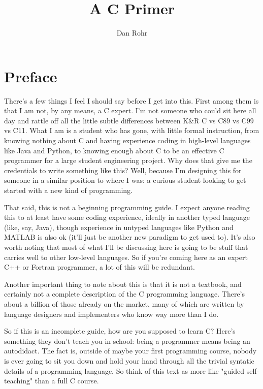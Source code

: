 \documentclass[ebook,11pt,oneside,openany]{memoir}
\title{A C Primer}
\author{Dan Rohr}
\begin{document}
\maketitle

\chapter*{Preface}

There's a few things I feel I should say before I get into this. First among them is that I am not, by any means, a C expert. I'm not someone who could sit here all day and rattle off all the little subtle differences between K\&R C vs C89 vs C99 vs C11. What I am is a student who has gone, with little formal instruction, from knowing nothing about C and having experience coding in high-level languages like Java and Python, to knowing enough about C to be an effective C programmer for a large student engineering project. Why does that give me the credentials to write something like this? Well, because I'm designing this for someone in a similar position to where I was: a curious student looking to get started with a new kind of programming.

That said, this is not a beginning programming guide. I expect anyone reading this to at least have some coding experience, ideally in another typed language (like, say, Java), though experience in untyped languages like Python and MATLAB is also ok (it'll just be another new paradigm to get used to). It's also worth noting that most of what I'll be discussing here is going to be stuff that carries well to other low-level languages. So if you're coming here as an expert C++ or Fortran programmer, a lot of this will be redundant.

Another important thing to note about this is that it is not a textbook, and certainly not a complete description of the C programming language. There's about a billion of those already on the market, many of which are written by language designers and implementers who know way more than I do. 

So if this is an incomplete guide, how are you supposed to learn C? Here's something they don't teach you in school: being a programmer means being an autodidact. The fact is, outside of maybe your first programming course,  nobody is ever going to sit you down and hold your hand through all the trivial syntatic details of a programming language. So think of this text as more like "guided self-teaching" than a full C course.
\end{document}
